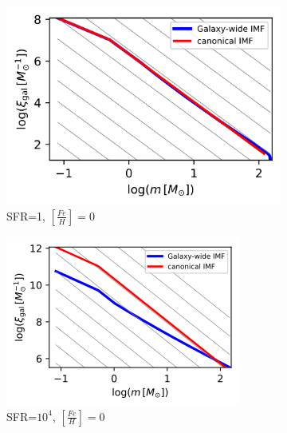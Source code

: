 \begin{figure}
	\centering
	\begin{subfigure}[b]{0.4\textwidth}
		\includegraphics[width=\textwidth]{sfr1-feh0.png}
		\caption{SFR=1, $[\frac{Fe}{H}]=0$}
		\label{fig:2d-5dt}
	\end{subfigure}
	\begin{subfigure}[b]{0.4\textwidth}
	\includegraphics[width=\textwidth]{sfr1e4-feh0.png}
	\caption{SFR=$10^4$, $[\frac{Fe}{H}]=0$}
	\label{fig:2d-5dt}
	\end{subfigure}
	\begin{subfigure}[b]{0.45\textwidth}

\end{subfigure}
\end{figure}
